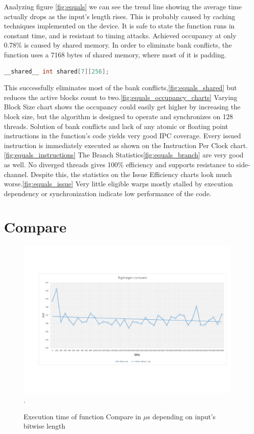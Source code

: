 \documentclass[oneside,openright,12pt,final,en]{mgr}
\begin{document}
 Analyzing figure \ref{fig:equals} we can see the trend line showing the average time actually drops as the input's length rises. This is probably caused by caching techniques implemented on the device. It is safe to state the function runs in constant time, and is resistant to timing attacks. Achieved occupancy at only 0.78\% is caused by shared memory.
 In order to eliminate bank conflicts, the function uses a 7168 bytes of shared memory, where most of it is padding.
\begin{lstlisting}[language=cpp]
	__shared__ int shared[7][256];
\end{lstlisting}
 This successfully eliminates most of the bank conflicts,\ref{fig:equals_shared} but reduces the active blocks count to two.\ref{fig:equals_occupancy_charts} Varying Block Size chart shows the occupancy could easily get higher by increasing the block size, but the algorithm is designed to operate and synchronizes on 128 threads. Solution of bank conflicts and lack of any atomic or floating point instructions in the function's code yields very good IPC coverage. Every issued instruction is immediately executed as shown on the Instruction Per Clock chart.\ref{fig:equals_instructions}
 The Branch Statistics\ref{fig:equals_branch} are very good as well. No diverged threads gives 100\% efficiency and supports resistance to side-channel. Despite this, the statistics on the Issue Efficiency charts look much worse.\ref{fig:equals_issue} Very little eligible warps mostly stalled by execution dependency or synchronization indicate low performance of the code.

\section{Compare}

\begin{figure}[H]
	\centering
	\includegraphics[width=\textwidth,trim={0 2.5cm 0 2.5cm},clip]{compare.pdf}.
	\caption{Execution time of function Compare in $\mu$s depending on input's bitwise length}
	\label{fig:compare}
\end{figure}
\end{document}
